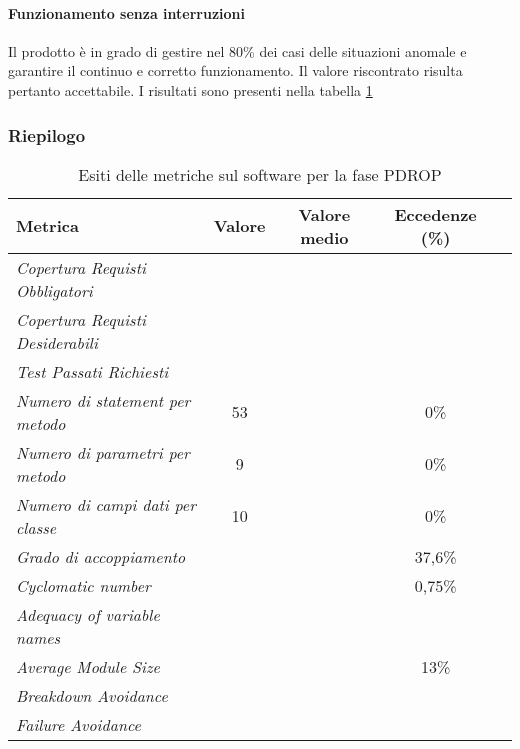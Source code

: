 \documentclass[../PianoDiQualifica.tex]{subfiles}
\begin{document}
\begin{appendices}
			\paragraph{Funzionamento senza interruzioni}	
			Il prodotto è in grado di gestire nel 80\% dei casi delle situazioni anomale e garantire il continuo e corretto funzionamento. Il valore riscontrato risulta pertanto accettabile.
			I risultati sono presenti nella tabella \ref{tab:esiti_metriche_sul_software}
			
			\subsubsection{Riepilogo}
			\begin{table}[H]
				\centering
				\begin{tabular}{l * {4}{c}}
					\toprule
					\textbf{Metrica} & \textbf{Valore} & \textbf{Valore medio} & \textbf{Eccedenze (\%) }\\
					\midrule
					\textit{Copertura Requisti Obbligatori}  & \color{red}{77,67\%} & & \\
					\textit{Copertura Requisti Desiderabili}  & \color{red}{76,92\%} & & \\
					\textit{Test Passati Richiesti}  & & & \\
					\textit{Numero di statement per metodo} & 53 & \color{dkgreen}{4,25} & 0\% \\
					\textit{Numero di parametri per metodo} & 9 & \color{dkgreen}{0,80} & 0\% \\
					\textit{Numero di campi dati per classe} & 10 & \color{dkgreen}{2,65} & 0\% \\
					\textit{Grado di accoppiamento}  & & \color{red}{10,11} & 37,6\% \\
					\textit{Cyclomatic number} & & \color{dkgreen}{1,69} & 0,75\% \\
					\textit{Adequacy of variable names}  & \color{dkgreen}{100\%} & & \\
					\textit{Average Module Size} & & \color{dkgreen}{19,84} & 13\% \\
					\textit{Breakdown Avoidance}  & & & \\
					\textit{Failure Avoidance}  & & & \\
					\bottomrule
				\end{tabular}
				\caption{Esiti delle metriche sul software per la fase PDROP}
				\label{tab:esiti_metriche_sul_software}
			\end{table}	
\end{appendices}
\end{document}

